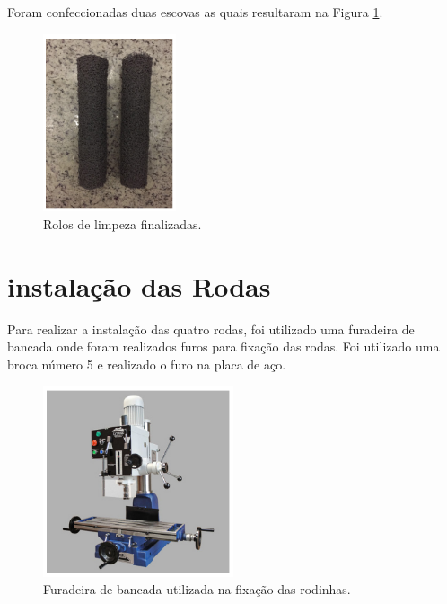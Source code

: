 Foram confeccionadas duas escovas as quais resultaram na Figura \ref{fig:rolo-fim}.

\par
\begin{figure}[h]
  \centering
  \includegraphics[width=0.35\textwidth]{figures/rolo-fim.png}
  \caption{Rolos de limpeza finalizadas.}
  \label{fig:rolo-fim}
\end{figure}
\FloatBarrier
\par

\section{instalação das Rodas}
Para realizar a instalação das quatro rodas, foi utilizado uma furadeira de bancada onde foram realizados furos para fixação das rodas. Foi utilizado uma broca número 5 e realizado o furo na placa de aço.

\par
\begin{figure}[h]
  \centering
  \includegraphics[width=0.5\textwidth]{figures/furadeira.png}
  \caption{Furadeira de bancada utilizada na fixação das rodinhas.}
  \label{fig:furadeira}
\end{figure}
\FloatBarrier
\par

